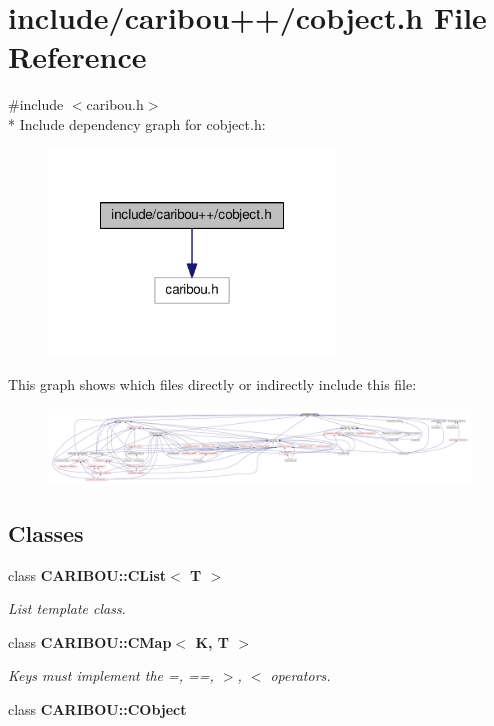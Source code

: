 \section{include/caribou++/cobject.h File Reference}
\label{cobject_8h}
{\ttfamily \#include $<$caribou.\-h$>$}\\*
Include dependency graph for cobject.\-h\-:\nopagebreak
\begin{figure}[H]
\begin{center}
\leavevmode
\includegraphics[width=216pt]{cobject_8h__incl}
\end{center}
\end{figure}
This graph shows which files directly or indirectly include this file\-:\nopagebreak
\begin{figure}[H]
\begin{center}
\leavevmode
\includegraphics[width=350pt]{cobject_8h__dep__incl}
\end{center}
\end{figure}
\subsection*{Classes}
\begin{DoxyCompactItemize}
\item 
class {\bf C\-A\-R\-I\-B\-O\-U\-::\-C\-List$<$ T $>$}
\begin{DoxyCompactList}\small\item\em List template class. \end{DoxyCompactList}\item 
class {\bf C\-A\-R\-I\-B\-O\-U\-::\-C\-Map$<$ K, T $>$}
\begin{DoxyCompactList}\small\item\em Keys must implement the =, ==, $>$, $<$ operators. \end{DoxyCompactList}\item 
class {\bf C\-A\-R\-I\-B\-O\-U\-::\-C\-Object}
\end{DoxyCompactItemize}
